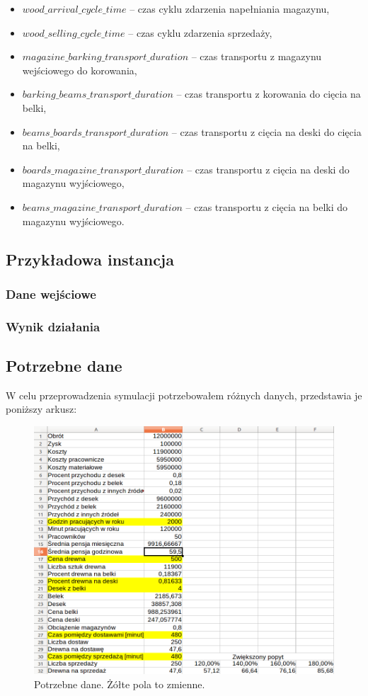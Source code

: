 \documentclass[a4paper]{article}
\begin{document}
\begin{itemize}
\item $wood\_arrival\_cycle\_time$ -- czas cyklu zdarzenia napełniania magazynu,
\item $wood\_selling\_cycle\_time$ -- czas cyklu zdarzenia sprzedaży,
\item $magazine\_barking\_transport\_duration$ -- czas transportu z magazynu wejściowego do korowania,
\item $barking\_beams\_transport\_duration$ -- czas transportu z korowania do cięcia na belki,
\item $beams\_boards\_transport\_duration$ -- czas transportu z cięcia na deski do cięcia na belki,
\item $boards\_magazine\_transport\_duration$ -- czas transportu z cięcia na deski do magazynu wyjściowego,
\item $beams\_magazine\_transport\_duration$ -- czas transportu z cięcia na belki do magazynu wyjściowego.
\end{itemize}
\subsection{Przykładowa instancja}
\subsubsection{Dane wejściowe}

\subsubsection{Wynik działania}

\subsection{Potrzebne dane}
W celu przeprowadzenia symulacji potrzebowałem różnych danych, przedstawia je poniższy arkusz:
\begin{figure}[H]
\centering
\includegraphics[scale=0.5]{img/arkusz.png}
\caption{Potrzebne dane. Żółte pola to zmienne.}
\end{figure}
\end{document}

